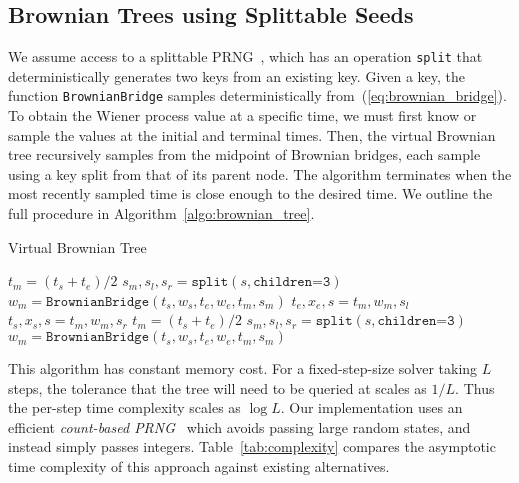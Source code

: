 \documentclass[twoside]{article}
\let\oldReturn\Return
\renewcommand{\Return}{\State\oldReturn}
\begin{document}
\subsection{Brownian Trees using Splittable Seeds}
We assume access to a splittable PRNG~\citep{claessen2013splittable}, which has an operation \texttt{split} that deterministically generates two keys from an existing key.
Given a key, the function \texttt{BrownianBridge} samples deterministically from~(\ref{eq:brownian_bridge}). 
To obtain the Wiener process value at a specific time, we must first know or sample the values at the initial and terminal times.
Then, the virtual Brownian tree recursively samples from the midpoint of Brownian bridges, each sample using a key split from that of its parent node.
The algorithm terminates when the most recently sampled time is close enough to the desired time. 
We outline the full procedure in Algorithm~\ref{algo:brownian_tree}.
\begin{algorithm}[h]
\centering
\caption{Virtual Brownian Tree}
\label{algo:brownian_tree}
\begin{algorithmic}

    \vspace{.75mm}
    \State $t_m = (t_s + t_e) / 2$
    \State $s_m, s_l, s_r = \texttt{split}(s, \texttt{children=3})$
    \State $w_m = \texttt{BrownianBridge}(t_s, w_s, t_e, w_e, t_m, s_m)$ 
     $t_e, x_e, s = t_m, w_m, s_l$
    \Else{} $t_s, x_s, s = t_m, w_m, s_r$
    \EndIf
    \State $t_m = (t_s + t_e) / 2$
    \State $s_m, s_l, s_r = \texttt{split}(s, \texttt{children=3}) $
    \State $w_m = \texttt{BrownianBridge}(t_s, w_s, t_e, w_e, t_m, s_m)$ 
    \EndWhile
\end{algorithmic}
\end{algorithm}
This algorithm has constant memory cost.
For a fixed-step-size solver taking $L$ steps, the tolerance that the tree will need to be queried at scales as $1 / L$.
Thus the per-step time complexity scales as $\log L$.
Our implementation uses an efficient \textit{count-based PRNG}~\cite{salmon2011parallel} which avoids passing large random states, and instead simply passes integers.
Table~\ref{tab:complexity} compares the asymptotic time complexity of this approach against existing alternatives.
\end{document}
